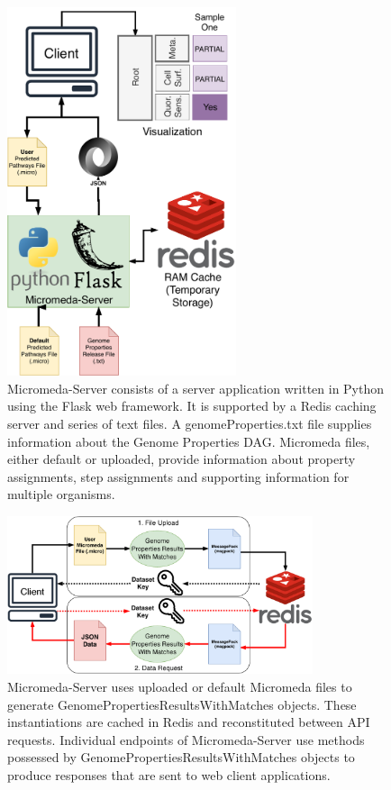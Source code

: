 \begin{figure}[!ht]
  \centering
	\includegraphics[width=0.60\textwidth]{media/Micromeda-Server.pdf}
	 \caption{Micromeda-Server consists of a server application written in Python using the Flask web framework. It is supported by a Redis caching server and series of text files. A genomeProperties.txt file supplies information about the Genome Properties DAG. Micromeda files, either default or uploaded, provide information about property assignments, step assignments and supporting information for multiple organisms.}
	 \label{fig:micromeda-server}
\end{figure}

\begin{figure}[!ht]
  \centering
	\includegraphics[width=0.80\textwidth]{media/Micromeda-Server-Workflow.pdf}
	 \caption{Micromeda-Server uses uploaded or default Micromeda files to generate GenomePropertiesResultsWithMatches objects. These instantiations are cached in Redis and reconstituted between API requests. Individual endpoints of Micromeda-Server use methods possessed by GenomePropertiesResultsWithMatches objects to produce responses that are sent to web client applications.}
	 \label{fig:micromeda-server-workflow}
\end{figure}

